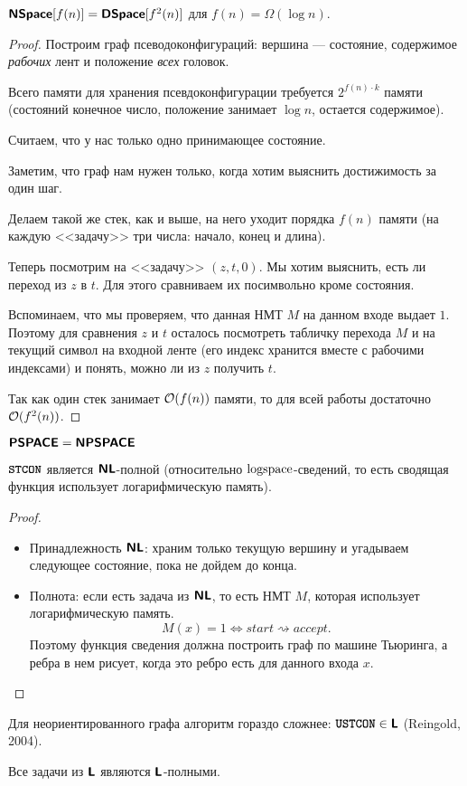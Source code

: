 \begin{thm}
	$ \textmd{\textbf{\textsf{NSpace}}}[f(n)] = \textmd{\textbf{\textsf{DSpace}}}[f^2(n)]$ для $ f(n) = \Omega (\log n)$.
\end{thm}
\begin{proof}
	Построим граф псеводоконфигураций: вершина --- состояние, содержимое \textit{рабочих} лент и положение \textit{всех} головок.

	Всего памяти для хранения псевдоконфигурации требуется  $ 2^{f(n)\cdot k}$ памяти (состояний конечное число, положение занимает $ \log n$, остается содержимое).

	Считаем, что у нас только одно принимающее состояние. 

	Заметим, что граф нам нужен только, когда хотим выяснить достижимость за один шаг.

	Делаем такой же стек, как и выше, на него уходит порядка $ f(n)$ памяти (на каждую <<задачу>> три числа: начало, конец и длина).

	Теперь посмотрим на <<задачу>> $ (z, t, 0)$. Мы хотим выяснить, есть ли переход из $ z$ в $ t$. Для этого сравниваем их посимвольно кроме состояния. 

	Вспоминаем, что мы проверяем, что данная НМТ $ M$ на данном входе выдает $ 1$. Поэтому для сравнения $ z$ и $ t$ осталось посмотреть табличку перехода $ M$ и на текущий символ на входной ленте (его индекс хранится вместе с рабочими индексами) и понять, можно ли из $ z$ получить $ t$.  

	Так как один стек занимает $ \mathcal{O}(f(n))$ памяти, то для всей работы достаточно $ \mathcal{O}(f^2(n))$.
\end{proof}
\begin{cor}
    $ \textmd{\textbf{\textsf{PSPACE}}} = \textmd{\textbf{\textsf{NPSPACE}}}$
\end{cor}

\begin{lm}
	$ {\textbf{\texttt{STCON}}}$ является $ \textmd{\textbf{\textsf{NL}}}$-полной (относительно $ \textmd{logspace}$-сведений, то есть сводящая функция использует логарифмическую память).
\end{lm}
\begin{proof}
	\begin{itemize}
		\item Принадлежность $ \textmd{\textbf{\textsf{NL}}}$: храним только текущую вершину и угадываем следующее состояние, пока не дойдем до конца.
		\item Полнота: если есть задача из $ \textmd{\textbf{\textsf{NL}}}$, то есть НМТ $ M$, которая использует логарифмическую память. 
			\[
				M(x) = 1 \Longleftrightarrow start \rightsquigarrow accept
			.\] 
			Поэтому функция сведения должна построить граф по машине Тьюринга, а ребра в нем рисует, когда это ребро есть для данного входа $ x$.
    \end{itemize}
\end{proof}
\begin{st}
	Для неориентированного графа алгоритм гораздо сложнее: $ {\textbf{\texttt{USTCON}}} \in \textmd{\textbf{\textsf{L}}}$ (Reingold, 2004).
\end{st}
\begin{st}
	Все задачи из $ \textmd{\textbf{\textsf{L}}}$ являются  $ \textmd{\textbf{\textsf{L}}}$-полными.
\end{st}

